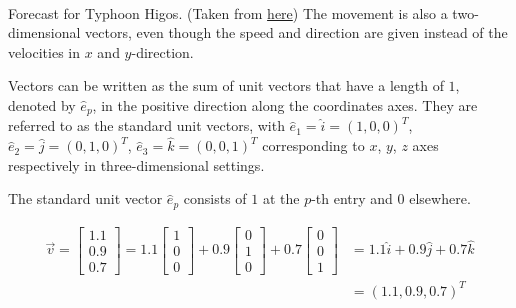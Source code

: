 \begin{center}
\\
Forecast for Typhoon Higos. (Taken from \href{http://www.hkww.org/weather/tcarchive.html}{here}) The movement is also a two-dimensional vectors, even though the speed and direction are given instead of the velocities in $x$ and $y$-direction.
\end{center}
Vectors can be written as the sum of unit vectors that have a length of $1$, denoted by $\hat{e}_p$, in the positive direction along the coordinates axes. They are referred to as the standard unit vectors, with $\hat{e}_1 = \hat{i} = (1,0,0)^T$, $\hat{e}_2 = \hat{j} = (0,1,0)^T$, $\hat{e}_3 = \hat{k} = (0,0,1)^T$ corresponding to $x$, $y$, $z$ axes respectively in three-dimensional settings.
\begin{defn}
The standard unit vector $\hat{e}_p$ consists of $1$ at the $p$-th entry and $0$ elsewhere.
\end{defn}
\begin{center}
\begin{align*}
\vec{v} = 
\begin{bmatrix}
1.1 \\
0.9 \\
0.7
\end{bmatrix}
= 1.1
\begin{bmatrix}
1 \\
0 \\
0
\end{bmatrix}
+ 0.9
\begin{bmatrix}
0 \\
1 \\
0
\end{bmatrix}
+ 0.7
\begin{bmatrix}
0 \\
0 \\
1
\end{bmatrix}
&= 1.1\hat{i} + 0.9\hat{j} + 0.7\hat{k}\\
&= (1.1,0.9,0.7)^T
\end{align*}
\end{center}

